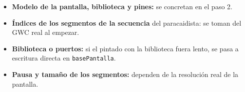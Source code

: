 \begin{itemize}
	\item \textbf{Modelo de la pantalla, biblioteca y pines:} se concretan en el paso 2.
	\item \textbf{Índices de los segmentos de la secuencia} del paracaidista: se toman del GWC real al empezar.
	\item \textbf{Biblioteca o puertos:} si el pintado con la biblioteca fuera lento, se pasa a escritura directa en \texttt{basePantalla}.
	\item \textbf{Pausa y tamaño de los segmentos:} dependen de la resolución real de la pantalla.
\end{itemize}

\clearpage
